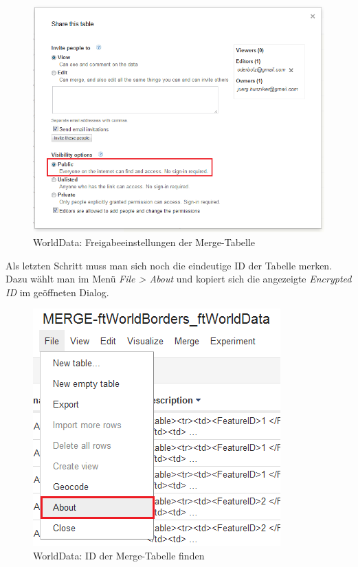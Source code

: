 \begin{figure}[H]
	\centering
	\includegraphics[scale=0.5]{images/usecase1-worlddata/documentation/worlddata-prepare_fusiontableslayer2.png}
	\caption{WorldData: Freigabeeinstellungen der Merge-Tabelle}
	\label{worlddata-prepare_fusiontableslayer2}
\end{figure}

Als letzten Schritt muss man sich noch die eindeutige ID der Tabelle merken. Dazu wählt man im Menü  \emph{File > About} und kopiert sich die angezeigte \emph{Encrypted ID} im geöffneten Dialog.

\begin{figure}[H]
	\centering
	\includegraphics[scale=0.7]{images/usecase1-worlddata/documentation/worlddata-prepare_fusiontableslayer3.png}
	\caption{WorldData: ID der Merge-Tabelle finden}
	\label{worlddata-prepare_fusiontableslayer3}
\end{figure}

